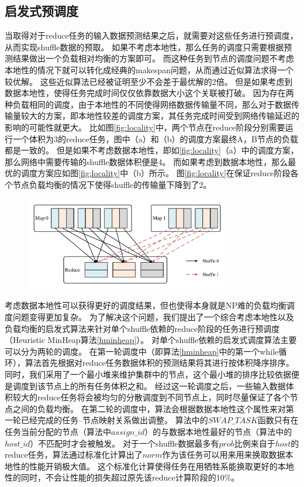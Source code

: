 \subsection{启发式预调度}
\label{subsec:schedule}

当取得对于reduce任务的输入数据预测结果之后，就需要对这些任务进行预调度，从而实现shuffle数据的预取。
如果不考虑本地性，那么任务的调度只需要根据预测结果做出一个负载相对均衡的方案即可。
而这种任务到节点的调度问题不考虑本地性的情况下就可以转化成经典的makespan问题，从而通过近似算法求得一个较优解\cite{approximation}。
这些近似算法已经被证明至少不会差于最优解的2倍。
但是如果考虑到数据本地性，使得任务完成时间仅仅依靠数据大小这个关联被打破。
因为存在两种负载相同的调度，由于本地性的不同使得网络数据传输量不同，那么对于数据传输量较大的方案，即本地性较差的调度方案，其任务完成时间受到网络传输延迟的影响的可能性就更大。
比如图\ref{fig:locality}中，两个节点在reduce阶段分别需要运行一个体积为3的reduce任务，图中（a）和（b）的调度方案最终A，B节点的负载都是一致的。
但是如果不考虑数据本地性，即如\ref{fig:locality}（a）中的调度方案，那么网络中需要传输的shuffle数据体积便是4。
而如果考虑到数据本地性，那么最优的调度方案应如图\ref{fig:locality}中（b）所示。
图\ref{fig:locality}在保证reduce阶段各个节点负载均衡的情况下使得shuffle的传输量下降到了2。

\begin{figure}[!htp]
    \centering
    \includegraphics[width=0.8\textwidth]{../figure/twoshuffles.pdf}
\end{figure}

考虑数据本地性可以获得更好的调度结果，但也使得本身就是NP难的负载均衡调度问题变得更加复杂。
为了解决这个问题，我们提出了一个综合考虑本地性以及负载均衡的启发式算法来针对单个shuffle依赖的reduce阶段的任务进行预调度（Heuristic MinHeap算法\ref{hminheap}）。
对单个shuffle依赖的启发式调度算法主要可以分为两轮的调度。
在第一轮调度中（即算法\ref{hminheap}中的第一个while循环），算法首先根据对reduce任务数据体积的预测结果将其进行按体积降序排序。
同时，我们采用了一个最小堆来维护集群中的节点，这个最小堆的排序比较依据便是调度到该节点上的所有任务体积之和。
经过这一轮调度之后，一些输入数据体积较大的reduce任务将会被均匀的分散调度到不同节点上，同时尽量保证了各个节点之间的负载均衡。
在第二轮的调度中，算法会根据数据本地性这个属性来对第一轮已经完成的任务--节点映射关系做出调整。
算法中的$SWAP\_TASK$函数只有在任务当前分配的节点（算法中$assign\_id$）的与数据本地性最好的节点（算法中的$host\_id$）不匹配时才会被触发。
对于一个shuffle数据最多有$prob$比例来自于$host$的reduce任务，算法通过标准化计算出了$norm$作为该任务可以用来用来换取数据本地性的性能开销极大值。
这个标准化计算使得任务在用牺牲系能换取更好的本地性的同时，不会让性能的损失超过原先该reduce计算阶段的10\%。

